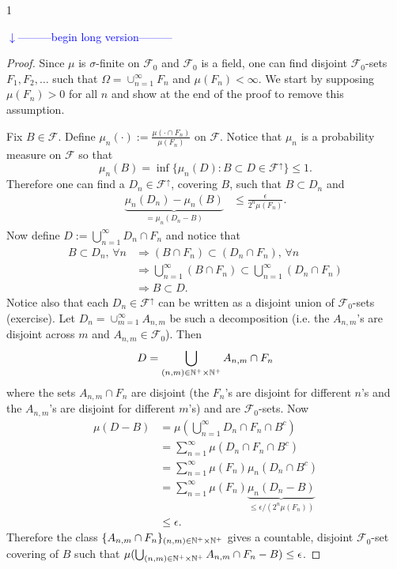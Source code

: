 \documentclass[10pt,letterpaper,twocolumn]{article}
\def\Ver{1}
\def\LongVer{1}
\begin{document}
\if\Ver\LongVer{
{\flushleft\textcolor{blue}{$\downarrow$---------begin long version---------}}\newline

\begin{proof}

Since $\mu$ is $\sigma$-finite on $\mathcal F_0$ and $\mathcal F_0$ is a field, one can find disjoint $\mathcal F_0$-sets $F_1, F_2,\ldots$ such that $\Omega = \cup_{n=1}^\infty F_n$ and $\mu(F_n)<\infty$. We start by supposing $\mu(F_n)>0$ for all $n$ and show at the end of the proof to remove this assumption.


Fix $B\in \mathcal F$.
Define  $ \mu_n(\cdot):= \frac{\mu(\cdot\cap F_n)}{\mu(F_n)} $ on $\mathcal F$. Notice that $\mu_n$ is a probability measure on $\mathcal F$ so that
\[ \mu_n(B)=\inf\{ \mu_n(D): B\subset D \in \mathcal F^{\uparrow}\}\leq 1. \]
Therefore one can find a $D_n\in \mathcal F^{\uparrow}$, covering $B$, such that
$B\subset D_n$ and
\begin{align}
\label{aaa}
\underbrace{\mu_n(D_n)-\mu_n(B)}_{=\mu_n(D_n - B)} &\leq \frac{\epsilon}{2^n \mu(F_n)}.
\end{align}
 Now define  $D :=\bigcup_{n=1}^\infty D_n\cap F_n$
and notice that
\begin{align*}
 B\subset D_n, \,\forall n&\Rightarrow (B\cap F_n) \subset (D_n\cap F_n), \,\forall n \\
 &\Rightarrow \bigcup_{n=1}^\infty  (B\cap  F_n) \subset  \bigcup_{n=1}^\infty (D_n\cap F_n) \\
 &\Rightarrow B\subset D.
 \end{align*}
Notice also that each  $D_n\in\mathcal F^\uparrow$ can be written as a disjoint union of $\mathcal F_0$-sets (exercise). Let $D_n = \cup_{m=1}^\infty A_{n,m}$ be such a decomposition (i.e. the $A_{n,m}$'s are  disjoint across $m$ and $A_{n,m}\in\mathcal F_0$). Then
\[D =  \bigcup_{(n,m)\in \Bbb N^+\times \Bbb N^+}  A_{n,m}\cap F_n\]
where the sets $A_{n,m}\cap F_n$ are disjoint (the $F_n$'s are disjoint for different $n$'s and  the $A_{n,m}$'s are disjoint for different $m$'s) and are $\mathcal F_0$-sets. Now
\begin{align}
\mu(D - B) &= \mu(\bigcup_{n=1}^\infty D_n\cap F_n \cap B^c)\nonumber\\
 &= \sum_{n=1}^\infty \mu(D_n\cap F_n \cap B^c)\nonumber\\
 &=  \sum_{n=1}^\infty \mu(F_n)\mu_n(D_n \cap B^c)\nonumber\\
  &=  \sum_{n=1}^\infty \mu(F_n)\underbrace{\mu_n(D_n - B)}_{\leq \epsilon/(2^n\mu(F_n))}\nonumber\\
 &\leq \epsilon.\label{if}
\end{align}
Therefore the class $\{ A_{n,m}\cap F_n\}_{(n,m)\in \Bbb N^+\times \Bbb N^+ }$ gives a countable, disjoint $\mathcal F_0$-set covering of $B$ such that $\mu(\bigcup_{(n,m)\in \Bbb N^+\times \Bbb N^+}  A_{n,m}\cap F_n - B )\leq \epsilon$.


\end{proof}}
\end{document}
